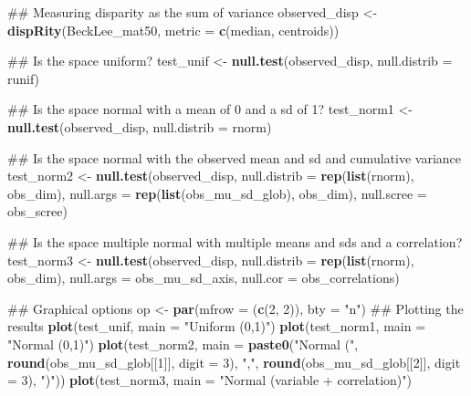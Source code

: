 \documentclass[]{book}
\newenvironment{Shaded}{\begin{snugshade}}{\end{snugshade}}
\newcommand{\KeywordTok}[1]{\textcolor[rgb]{0.13,0.29,0.53}{\textbf{#1}}}
\newcommand{\DataTypeTok}[1]{\textcolor[rgb]{0.13,0.29,0.53}{#1}}
\newcommand{\DecValTok}[1]{\textcolor[rgb]{0.00,0.00,0.81}{#1}}
\newcommand{\StringTok}[1]{\textcolor[rgb]{0.31,0.60,0.02}{#1}}
\newcommand{\NormalTok}[1]{#1}
\theoremstyle{definition}
\theoremstyle{definition}
\theoremstyle{remark}
\begin{document}
\begin{Shaded}
\begin{Highlighting}[]
\NormalTok{## Measuring disparity as the sum of variance}
\NormalTok{observed_disp <-}\StringTok{ }\KeywordTok{dispRity}\NormalTok{(BeckLee_mat50, }\DataTypeTok{metric =} \KeywordTok{c}\NormalTok{(median, centroids))}

\NormalTok{## Is the space uniform?}
\NormalTok{test_unif <-}\StringTok{ }\KeywordTok{null.test}\NormalTok{(observed_disp, }\DataTypeTok{null.distrib =}\NormalTok{ runif)}

\NormalTok{## Is the space normal with a mean of 0 and a sd of 1?}
\NormalTok{test_norm1 <-}\StringTok{ }\KeywordTok{null.test}\NormalTok{(observed_disp, }\DataTypeTok{null.distrib =}\NormalTok{ rnorm)}

\NormalTok{## Is the space normal with the observed mean and sd and cumulative variance}
\NormalTok{test_norm2 <-}\StringTok{ }\KeywordTok{null.test}\NormalTok{(observed_disp, }\DataTypeTok{null.distrib =} \KeywordTok{rep}\NormalTok{(}\KeywordTok{list}\NormalTok{(rnorm), obs_dim),}
                        \DataTypeTok{null.args =} \KeywordTok{rep}\NormalTok{(}\KeywordTok{list}\NormalTok{(obs_mu_sd_glob), obs_dim),}
                        \DataTypeTok{null.scree =}\NormalTok{ obs_scree)}

\NormalTok{## Is the space multiple normal with multiple means and sds and a correlation?}
\NormalTok{test_norm3 <-}\StringTok{ }\KeywordTok{null.test}\NormalTok{(observed_disp, }\DataTypeTok{null.distrib =} \KeywordTok{rep}\NormalTok{(}\KeywordTok{list}\NormalTok{(rnorm), obs_dim),}
                        \DataTypeTok{null.args =}\NormalTok{ obs_mu_sd_axis, }\DataTypeTok{null.cor =}\NormalTok{ obs_correlations)}


\NormalTok{## Graphical options}
\NormalTok{op <-}\StringTok{ }\KeywordTok{par}\NormalTok{(}\DataTypeTok{mfrow =}\NormalTok{ (}\KeywordTok{c}\NormalTok{(}\DecValTok{2}\NormalTok{, }\DecValTok{2}\NormalTok{)), }\DataTypeTok{bty =} \StringTok{"n"}\NormalTok{)}
\NormalTok{## Plotting the results}
\KeywordTok{plot}\NormalTok{(test_unif, }\DataTypeTok{main =} \StringTok{"Uniform (0,1)"}\NormalTok{)}
\KeywordTok{plot}\NormalTok{(test_norm1, }\DataTypeTok{main =} \StringTok{"Normal (0,1)"}\NormalTok{)}
\KeywordTok{plot}\NormalTok{(test_norm2, }\DataTypeTok{main =} \KeywordTok{paste0}\NormalTok{(}\StringTok{"Normal ("}\NormalTok{, }\KeywordTok{round}\NormalTok{(obs_mu_sd_glob[[}\DecValTok{1}\NormalTok{]], }\DataTypeTok{digit =} \DecValTok{3}\NormalTok{),}
                              \StringTok{","}\NormalTok{, }\KeywordTok{round}\NormalTok{(obs_mu_sd_glob[[}\DecValTok{2}\NormalTok{]], }\DataTypeTok{digit =} \DecValTok{3}\NormalTok{), }\StringTok{")"}\NormalTok{))}
\KeywordTok{plot}\NormalTok{(test_norm3, }\DataTypeTok{main =} \StringTok{"Normal (variable + correlation)"}\NormalTok{)}
\end{Highlighting}
\end{Shaded}
\end{document}
